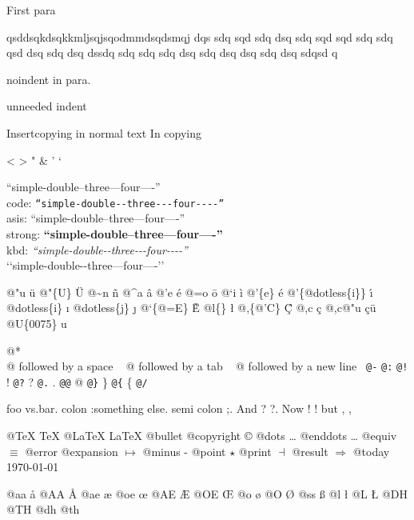 \documentclass{book}
\begin{document}
First para

\noindent{}qsddsqkdsqkkmljsqjsqodmmdsqdsmqj dqs sdq sqd sdq dsq sdq sqd sqd sdq sdq 
qsd dsq sdq dsq dssdq sdq sdq sdq dsq sdq dsq dsq sdq dsq sdqsd q

\noindent{}noindent in para.

unneeded indent

Insertcopying in normal text
In copying

<
>
"
\&
'
`

``simple-double--three---four----''\leavevmode{}\\
code: \texttt{``simple-double{-}{-}three{-}{-}{-}four{-}{-}{-}-''} \leavevmode{}\\
asis: ``simple-double--three---four----'' \leavevmode{}\\
strong: \textbf{``simple-double--three---four----''} \leavevmode{}\\
kbd: {\ttfamily\textsl{``simple-double{-}{-}three{-}{-}{-}four{-}{-}{-}-''}} \leavevmode{}\\

`\hbox{}`simple-double-\hbox{}-three---four----'\hbox{}'\leavevmode{}\\

%
%
%
%

@"u \"{u} 
@"\{U\} \"{U} 
@\~{}n \~{n}
@\^{}a \^{a}
@'e \'{e}
@=o \={o}
@`i \`{i}
@'\{e\} \'{e}
@'\{@dotless\{i\}\} \'{\i{}} 
@dotless\{i\} \i{}
@dotless\{j\} \j{}
@`\{@=E\} \`{\={E}} 
@l\{\} \l{}
@,\{@'C\} \c{\'{C}}
@,c \c{c}
@,c@"u \c{c}\"{u} \leavevmode{}\\

@U\{0075\} u

@* \leavevmode{}\\
@ followed by a space
\ {}
@ followed by a tab
\ {}
@ followed by a new line
\ {}\texttt{@-} \-{}
\texttt{@:} \@
\texttt{@!} \@!
\texttt{@?} \@?
\texttt{@.} \@.
\texttt{@@} @
\texttt{@\}} \}
\texttt{@\{} \{
\texttt{@/} 

foo vs.\@ bar. 
colon :\@And something else.
semi colon ;\@.
And ? ?\@.
Now ! !\@@
but , ,\@

@TeX \TeX{}
@LaTeX \LaTeX{}
@bullet \textbullet{}
@copyright \copyright{}
@dots \dots{}\@
@enddots \dots{}
@equiv $\equiv{}$
@error 
@expansion $\mapsto{}$
@minus -
@point $\star{}$
@print $\dashv{}$
@result $\Rightarrow{}$
@today \today{}

@aa \aa{}
@AA \AA{}
@ae \ae{}
@oe \oe{}
@AE \AE{}
@OE \OE{}
@o \o{}
@O \O{}
@ss \ss{}
@l \l{}
@L \L{}
@DH \DH{}
@TH \TH{}
@dh \dh{}
@th \th{}
\end{document}
